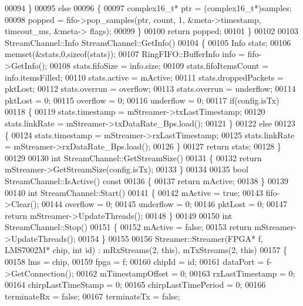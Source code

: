 \begin{DoxyCode}
00094     \}
00095     \textcolor{keywordflow}{else}
00096     \{
00097         complex16_t* ptr = (complex16_t*)samples;
00098         popped = fifo->pop_samples(ptr, count, 1, &meta->timestamp, timeout\_ms, &meta->
      flags);
00099     \}
00100     \textcolor{keywordflow}{return} popped;
00101 \}
00102 
00103 StreamChannel::Info StreamChannel::GetInfo()
00104 \{
00105     Info stats;
00106     memset(&stats,0,\textcolor{keyword}{sizeof}(stats));
00107     RingFIFO::BufferInfo info = fifo->GetInfo();
00108     stats.fifoSize = info.size;
00109     stats.fifoItemsCount = info.itemsFilled;
00110     stats.active = mActive;
00111     stats.droppedPackets = pktLost;
00112     stats.overrun = overflow;
00113     stats.overrun = underflow;
00114     pktLost = 0;
00115     overflow = 0;
00116     underflow = 0;
00117     \textcolor{keywordflow}{if}(config.isTx)
00118     \{
00119         stats.timestamp = mStreamer->txLastTimestamp;
00120         stats.linkRate = mStreamer->txDataRate_Bps.load();
00121     \}
00122     \textcolor{keywordflow}{else}
00123     \{
00124         stats.timestamp = mStreamer->rxLastTimestamp;
00125         stats.linkRate = mStreamer->rxDataRate_Bps.load();
00126     \}
00127     \textcolor{keywordflow}{return} stats;
00128 \}
00129 
00130 \textcolor{keywordtype}{int} StreamChannel::GetStreamSize()
00131 \{
00132     \textcolor{keywordflow}{return} mStreamer->GetStreamSize(config.isTx);
00133 \}
00134 
00135 \textcolor{keywordtype}{bool} StreamChannel::IsActive()\textcolor{keyword}{ const}
00136 \textcolor{keyword}{}\{
00137     \textcolor{keywordflow}{return} mActive;
00138 \}
00139 
00140 \textcolor{keywordtype}{int} StreamChannel::Start()
00141 \{
00142     mActive = \textcolor{keyword}{true};
00143     fifo->Clear();
00144     overflow = 0;
00145     underflow = 0;
00146     pktLost = 0;
00147     \textcolor{keywordflow}{return} mStreamer->UpdateThreads();
00148 \}
00149 
00150 \textcolor{keywordtype}{int} StreamChannel::Stop()
00151 \{
00152     mActive = \textcolor{keyword}{false};
00153     \textcolor{keywordflow}{return} mStreamer->UpdateThreads();
00154 \}
00155 
00156 Streamer::Streamer(FPGA* f, LMS7002M* chip, \textcolor{keywordtype}{int} \textcolor{keywordtype}{id}) : mRxStreams(2, this), mTxStreams(2, this)
00157 \{
00158     lms = chip,
00159     fpga = f;
00160     chipId = id;
00161     dataPort = f->GetConnection();
00162     mTimestampOffset = 0;
00163     rxLastTimestamp = 0;
00164     chirpLastTimeStamp = 0;
00165     chirpLastTimePeriod = 0;
00166     terminateRx = \textcolor{keyword}{false};
00167     terminateTx = \textcolor{keyword}{false};

\end{DoxyCode}
